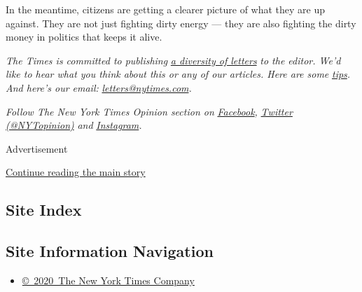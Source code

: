 In the meantime, citizens are getting a clearer picture of what they are
up against. They are not just fighting dirty energy --- they are also
fighting the dirty money in politics that keeps it alive.

\emph{The Times is committed to publishing}
\href{https://www.nytimes.com/2019/01/31/opinion/letters/letters-to-editor-new-york-times-women.html}{\emph{a
diversity of letters}} \emph{to the editor. We'd like to hear what you
think about this or any of our articles. Here are some}
\href{https://help.nytimes.com/hc/en-us/articles/115014925288-How-to-submit-a-letter-to-the-editor}{\emph{tips}}\emph{.
And here's our email:}
\href{mailto:letters@nytimes.com}{\emph{letters@nytimes.com}}\emph{.}

\emph{Follow The New York Times Opinion section on}
\href{https://www.facebook.com/nytopinion}{\emph{Facebook}}\emph{,}
\href{http://twitter.com/NYTOpinion}{\emph{Twitter (@NYTopinion)}}
\emph{and}
\href{https://www.instagram.com/nytopinion/}{\emph{Instagram}}\emph{.}

Advertisement

\protect\hyperlink{after-bottom}{Continue reading the main story}

\hypertarget{site-index}{%
\subsection{Site Index}\label{site-index}}

\hypertarget{site-information-navigation}{%
\subsection{Site Information
Navigation}\label{site-information-navigation}}

\begin{itemize}
\tightlist
\item
  \href{https://help.nytimes.com/hc/en-us/articles/115014792127-Copyright-notice}{©~2020~The
  New York Times Company}
\end{itemize}

